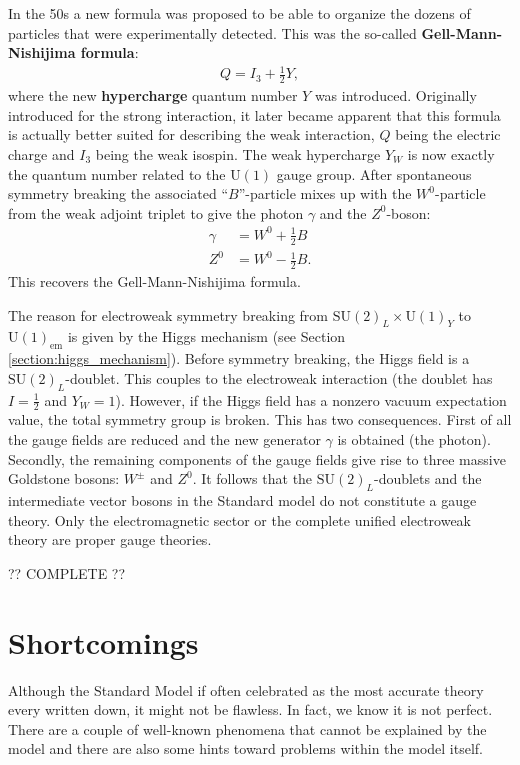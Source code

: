     In the 50s a new formula was proposed to be able to organize the dozens of particles that were experimentally detected. This was the so-called \textbf{Gell-Mann-Nishijima formula}:
    \begin{gather}
        Q = I_3 + \tfrac{1}{2}Y,
    \end{gather}
    where the new \textbf{hypercharge} quantum number $Y$ was introduced. Originally introduced for the strong interaction, it later became apparent that this formula is actually better suited for describing the weak interaction, $Q$ being the electric charge and $I_3$ being the weak isospin. The weak hypercharge $Y_W$ is now exactly the quantum number related to the $\mathrm{U}(1)$ gauge group. After spontaneous symmetry breaking the associated ``$B$''-particle mixes up with the $W^0$-particle from the weak adjoint triplet to give the photon $\gamma$ and the $Z^0$-boson:
    \begin{align}
        \gamma &= W^0 + \tfrac{1}{2}B\\
        Z^0 &= W^0 - \tfrac{1}{2}B.
    \end{align}
    This recovers the Gell-Mann-Nishijima formula.

    The reason for electroweak symmetry breaking from $\mathrm{SU}(2)_L\times\mathrm{U}(1)_Y$ to $\mathrm{U}(1)_\text{em}$ is given by the Higgs mechanism (see Section \ref{section:higgs_mechanism}). Before symmetry breaking, the Higgs field is a $\mathrm{SU}(2)_L$-doublet. This couples to the electroweak interaction (the doublet has $I=\tfrac{1}{2}$ and $Y_W=1$). However, if the Higgs field has a nonzero vacuum expectation value, the total symmetry group is broken. This has two consequences. First of all the gauge fields are reduced and the new generator $\gamma$ is obtained (the photon). Secondly, the remaining components of the gauge fields give rise to three massive Goldstone bosons: $W^\pm$ and $Z^0$. It follows that the $\mathrm{SU}(2)_L$-doublets and the intermediate vector bosons in the Standard model do not constitute a gauge theory. Only the electromagnetic sector or the complete unified electroweak theory are proper gauge theories.

    ?? COMPLETE ??

\section{Shortcomings}

    Although the Standard Model if often celebrated as the most accurate theory every written down, it might not be flawless. In fact, we know it is not perfect. There are a couple of well-known phenomena that cannot be explained by the model and there are also some hints toward problems within the model itself.

